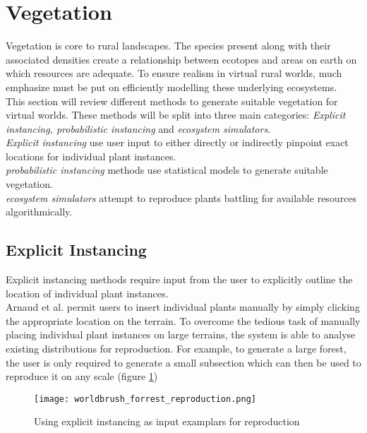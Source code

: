 \section{Vegetation}

Vegetation is core to rural landscapes. The species present along with their associated densities create a relationship between ecotopes and areas on earth on which resources are adequate. To ensure realism in virtual rural worlds, much emphasize must be put on efficiently modelling these underlying ecosystems.\\

This section will review different methods to generate suitable vegetation for virtual worlds. These methods will be split into three main categories: \textit{Explicit instancing, probabilistic instancing} and \textit{ecosystem simulators}.\\
\textit{Explicit instancing} use user input to either directly or indirectly pinpoint exact locations for individual plant instances.\\
\textit{probabilistic instancing} methods use statistical models to generate suitable vegetation.\\ 
\textit{ecosystem simulators} attempt to reproduce plants battling for available resources algorithmically.\\

\subsection{Explicit Instancing} \label{Explicit Instancing}
Explicit instancing methods require input from the user to explicitly outline the location of individual plant instances. \\
Arnaud et al. \cite{Emilien} permit users to insert individual plants manually by simply clicking the appropriate location on the terrain. To overcome the tedious task of manually placing individual plant instances on large terrains, the system is able to analyse existing distributions for reproduction. For example, to generate a large forest, the user is only required to generate a small subsection which can then be used to reproduce it on any scale (figure \ref{Explicit instancing as input examplars}) \\

\begin{figure}[h]
  \centering
	\label{Explicit instancing as input examplars}
	\texttt{[image: worldbrush\_forrest\_reproduction.png]}
	\caption{Using explicit instancing as input examplars for reproduction \cite{Emilien}}
\end{figure}

